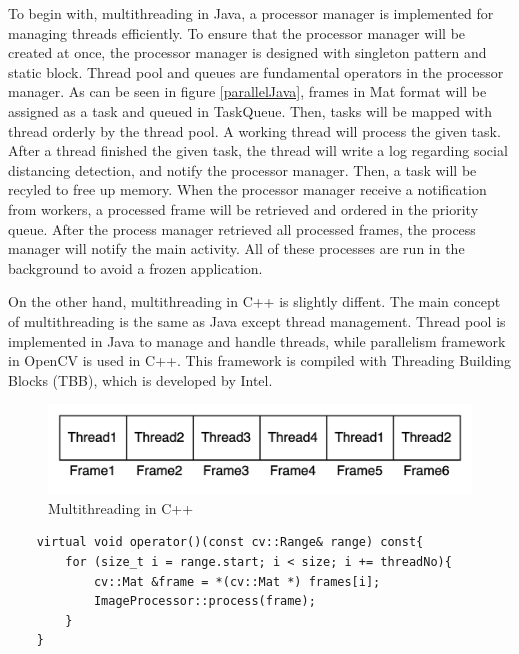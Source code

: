         To begin with, multithreading in Java, a processor manager is implemented for managing threads efficiently.
        To ensure that the processor manager will be created at once,
        the processor manager is designed with singleton pattern and static block.
        Thread pool and queues are fundamental operators in the processor manager.
        As can be seen in figure \ref{parallelJava}, frames in Mat format will be assigned as a task and queued in TaskQueue.
        Then, tasks will be mapped with thread orderly by the thread pool.
        A working thread will process the given task.
        After a thread finished the given task,
        the thread will write a log regarding social distancing detection, and notify the processor manager.
        Then, a task will be recyled to free up memory.
        When the processor manager receive a notification from workers,
        a processed frame will be retrieved and ordered in the priority queue.
        After the process manager retrieved all processed frames,
        the process manager will notify the main activity.
        All of these processes are run in the background to avoid a frozen application.

        On the other hand, multithreading in C++ is slightly diffent.
        The main concept of multithreading is the same as Java except thread management.
        Thread pool is implemented in Java to manage and handle threads,
        while parallelism framework in OpenCV is used in C++.
        This framework is compiled with Threading Building Blocks (TBB), which is developed by Intel.

        \begin{figure}[!ht]
            \centering
            \includegraphics[width=5in]{images/chapter3/cpp-parallel.png}
            \caption{Multithreading in C++}
            \label{parallelCpp}
        \end{figure}

\begin{lstlisting}
    virtual void operator()(const cv::Range& range) const{
        for (size_t i = range.start; i < size; i += threadNo){
            cv::Mat &frame = *(cv::Mat *) frames[i];
            ImageProcessor::process(frame);
        }
    }
\end{lstlisting}

